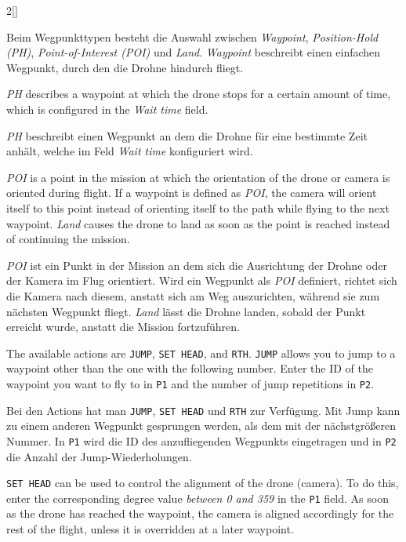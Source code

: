 \begin{paracol}{2}[]
\colger

Beim Wegpunkttypen besteht die Auswahl zwischen \textsl{Waypoint}, \textsl{Position-Hold (PH)}, \textsl{Point-of-Interest (POI)} und \textsl{Land}. \textsl{Waypoint} beschreibt einen einfachen Wegpunkt, durch den die Drohne hindurch fliegt. 

\coleng

 \textsl{PH} describes a waypoint at which the drone stops for a certain amount of time, which is configured in the \textsl{Wait time} field.

\colger

\textsl{PH} beschreibt einen Wegpunkt an dem die Drohne für eine bestimmte Zeit anhält, welche im Feld \textsl{Wait time} konfiguriert wird. 

\coleng

\textsl{POI} is a point in the mission at which the orientation of the drone or camera is oriented during flight. If a waypoint is defined as \textsl{POI}, the camera will orient itself to this point instead of orienting itself to the path while flying to the next waypoint. \textsl{Land} causes the drone to land as soon as the point is reached instead of continuing the mission.

\colger

\textsl{POI} ist ein Punkt in der Mission an dem sich die Ausrichtung der Drohne oder der Kamera im Flug orientiert. Wird ein Wegpunkt als \textsl{POI} definiert, richtet sich die Kamera nach diesem, anstatt sich am Weg auszurichten, während sie zum nächsten Wegpunkt fliegt. \textsl{Land} lässt die Drohne landen, sobald der Punkt erreicht wurde, anstatt die Mission fortzuführen.

\coleng

The available actions are \texttt{JUMP}, \texttt{SET HEAD}, and \texttt{RTH}. \texttt{JUMP} allows you to jump to a waypoint other than the one with the following number. Enter the ID of the waypoint you want to fly to in \texttt{P1} and the number of jump repetitions in \texttt{P2}.

\colger

Bei den Actions hat man \texttt{JUMP}, \texttt{SET HEAD} und \texttt{RTH} zur Verfügung. Mit Jump kann zu einem anderen Wegpunkt gesprungen werden, als dem mit der nächstgrößeren Nummer. In \texttt{P1} wird die ID des anzufliegenden Wegpunkts eingetragen und in \texttt{P2} die Anzahl der Jump-Wiederholungen.

\coleng

\texttt{SET HEAD} can be used to control the alignment of the drone (camera). To do this, enter the corresponding degree value \textsl{between 0 and 359 }in the \texttt{P1} field. As soon as the drone has reached the waypoint, the camera is aligned accordingly for the rest of the flight, unless it is overridden at a later waypoint.


\end{paracol}
